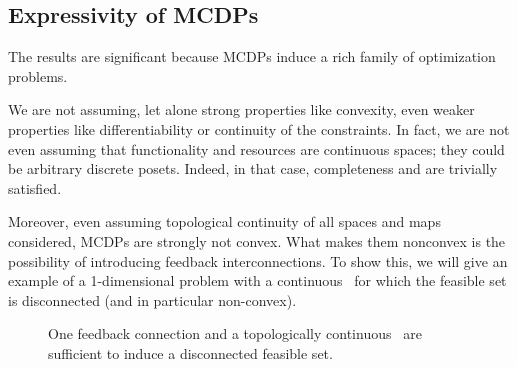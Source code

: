 \subsection{Expressivity of MCDPs}
The results are significant because MCDPs induce a rich family of
optimization problems.

We are not assuming, let alone strong properties like convexity, even
weaker properties like differentiability or continuity of the constraints.
In fact, we are not even assuming that functionality and resources
are continuous spaces; they could be arbitrary discrete posets.
Indeed, in that case, completeness and \scottcontinuity are trivially satisfied.


Moreover, even assuming topological continuity of all spaces and maps
considered, MCDPs are strongly not convex. What makes them nonconvex
is the possibility of introducing feedback interconnections. To show
this, we will give an example of a 1-dimensional problem with a continuous~\ftor
for which the feasible set is disconnected (and in particular non-convex).

\begin{figure}[h]
  \hfill
  \hfill
  \hfill
  \caption{One feedback connection and a topologically continuous~\ftor
  are sufficient to induce a disconnected feasible set.}
  \label{fig:ceil-1}
\end{figure}

\medskip{}

